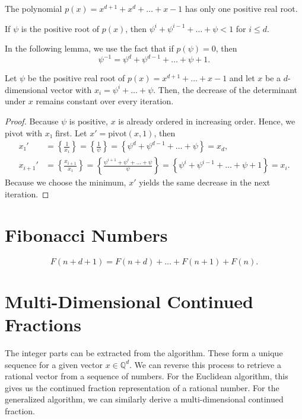 \documentclass[english,version-2020-11]{uzl-thesis}
\begin{document}
\begin{lemma}
  The polynomial $p(x) = x^{d+1} + x^d + \dots + x - 1$ has only one positive real root.
\end{lemma}

\begin{corollary}
  If $ψ$ is the positive root of $p(x)$, then $ψ^i + ψ^{i-1} + \dots + ψ < 1$ for $i ≤ d$.
\end{corollary}

In the following lemma, we use the fact that if $p(ψ) = 0$, then
\[
  ψ^{-1} = ψ^d + ψ^{d-1} + \dots + ψ + 1.
\]

\begin{lemma}
  Let $ψ$ be the positive real root of $p(x) = x^{d+1} + \dots + x - 1$
  and let $x$ be a $d$-dimensional vector with $x_i = ψ^i + \dots + ψ$.
  Then, the decrease of the determinant under $x$ remains constant over every iteration.
\end{lemma}

\begin{proof}
  Because $ψ$ is positive, $x$ is already ordered in increasing order.
  Hence, we pivot with $x₁$ first.
  Let $x' = \mathrm{pivot}(x, 1)$,
  then
  \begin{align*}
    x₁'
    & = \left\{\frac{1}{x₁}\right\}
    = \left\{\frac1{ψ}\right\}
    = \left\{ψ^d + ψ^{d-1} + \dots + ψ\right\} = x_d, \\
    x_{i+1}'
    & = \left\{\frac{x_{i+1}}{x₁}\right\}
    = \left\{\frac{ψ^{i+1} + ψ^i + \dots + ψ}{ψ}\right\}
    = \left\{ψ^i + ψ^{i-1} + \dots + ψ + 1\right\}
    = x_i.
  \end{align*}
  Because we choose the minimum, $x'$ yields the same decrease in the next iteration.
\end{proof}

\section{Fibonacci Numbers}

\[
  F(n + d + 1) = F(n + d) + \dots + F(n + 1) + F(n).
\]

\section{Multi-Dimensional Continued Fractions}

The integer parts can be extracted from the algorithm.
These form a unique sequence for a given vector $x ∈ ℚ^d$.
We can reverse this process to retrieve a rational vector from a sequence of numbers.
For the Euclidean algorithm, this gives us the continued fraction representation of a rational number.
For the generalized algorithm, we can similarly derive a multi-dimensional continued fraction.
\end{document}
